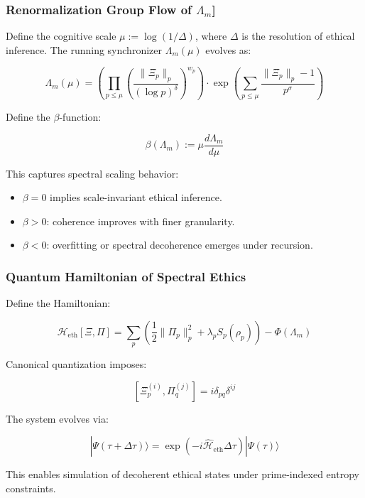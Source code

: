 \documentclass{article}
\theoremstyle{plain}
\theoremstyle{claimstyle}
\begin{document}
\subsubsection{Renormalization Group Flow of $\Lambda_m$]}

\begin{definition}
Define the cognitive scale $\mu := \log(1/\Delta)$, where $\Delta$ is the resolution of ethical inference. The running synchronizer $\Lambda_m(\mu)$ evolves as:

\[
\Lambda_m(\mu) = \left( \prod_{p \leq \mu} \left( \frac{ \| \Xî_p \|_p }{ (\log p)^\delta } \right)^{w_p} \right) \cdot \exp\left( \sum_{p \leq \mu} \frac{ \| \Xî_p \|_p - 1 }{p^\sigma} \right)
\]

Define the $\beta$-function:

\[
\beta(\Lambda_m) := \mu \frac{d\Lambda_m}{d\mu}
\]

This captures spectral scaling behavior:
\begin{itemize}
  \item $\beta = 0$ implies scale-invariant ethical inference.
  \item $\beta > 0$: coherence improves with finer granularity.
  \item $\beta < 0$: overfitting or spectral decoherence emerges under recursion.
\end{itemize}
\end{definition}


\subsubsection{Quantum Hamiltonian of Spectral Ethics}
\begin{definition}
Define the Hamiltonian:

\[
\mathcal{H}_{\mathrm{eth}}[\Xi, \Pi] = \sum_p \left( \frac{1}{2} \|\Pi_p\|_p^2 + \lambda_p S_p(\rho_p) \right) - \Phi(\Lambda_m)
\]

Canonical quantization imposes:

\[
[\Xî_p^{(i)}, \Pi_q^{(j)}] = i \delta_{pq} \delta^{ij}
\]

The system evolves via:

\[
|\Psi(\tau + \Delta\tau)\rangle = \exp\left( -i \widehat{\mathcal{H}}_{\mathrm{eth}} \Delta\tau \right) |\Psi(\tau)\rangle
\]

This enables simulation of decoherent ethical states under prime-indexed entropy constraints.
\end{definition}
\end{document}
